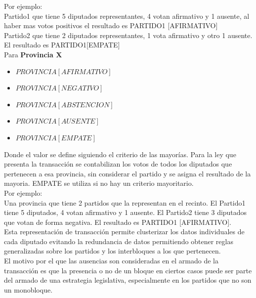 \documentclass{endm}
\begin{document}
Por ejemplo: \\

Partido1 que tiene 5 diputados representantes, 4 votan afirmativo y 1 ausente, al haber mas votos positivos el resultado es PARTIDO1 [AFIRMATIVO] \\

Partido2 que tiene 2 diputados representantes, 1 vota afirmativo y otro 1 ausente. El resultado es PARTIDO1[EMPATE] \\

Para \textbf{Provincia X} \\

\begin{itemize}
\item $PROVINCIA [AFIRMATIVO]$
\item $PROVINCIA [NEGATIVO]$
\item $PROVINCIA [ABSTENCION]$
\item $PROVINCIA [AUSENTE]$ 
\item $PROVINCIA [EMPATE]$ \\
\end{itemize}

Donde el valor se define siguiendo el criterio de las mayorías. Para la ley que presenta la transacción se contabilizan los votos de todos los diputados que pertenecen a esa provincia, sin considerar el partido y se asigna el resultado de la mayoria. EMPATE se utiliza si no hay un criterio mayoritario. \\

Por ejemplo: \\

Una provincia que tiene 2 partidos que la representan en el recinto. El Partido1 tiene 5 diputados, 4 votan afirmativo y 1 ausente. El Partido2 tiene 3 diputados que votan de forma negativa. El resultado es PARTIDO1 [AFIRMATIVO]. \\

Esta representación de transacción permite clusterizar los datos individuales de cada diputado evitando la redundancia de datos permitiendo obtener reglas generalizadas sobre los partidos y los interbloques a los que pertenecen. \\

El motivo por el que las ausencias son consideradas en el armado de la transacción es que la presencia o no de un bloque en ciertos casos puede ser parte del armado de una estrategia legislativa, especialmente en los partidos que no son un monobloque.

\newpage 
\end{document}
